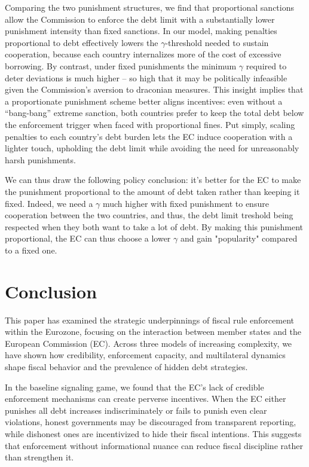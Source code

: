 \documentclass{article}
\begin{document}
Comparing the two punishment structures, we find that proportional sanctions allow the Commission to enforce the debt limit with a substantially lower punishment intensity than fixed sanctions. In our model, making penalties proportional to debt effectively lowers the $\gamma$-threshold needed to sustain cooperation, because each country internalizes more of the cost of excessive borrowing. By contrast, under fixed punishments the minimum $\gamma$ required to deter deviations is much higher – so high that it may be politically infeasible given the Commission’s aversion to draconian measures. This insight implies that a proportionate punishment scheme better aligns incentives: even without a “bang-bang” extreme sanction, both countries prefer to keep the total debt below the enforcement trigger when faced with proportional fines. Put simply, scaling penalties to each country’s debt burden lets the EC induce cooperation with a lighter touch, upholding the debt limit while avoiding the need for unreasonably harsh punishments.

We can thus draw the following policy conclusion: it's better for the EC to make the punishment proportional to the amount of debt taken rather than keeping it fixed. Indeed, we need a $\gamma$ much higher with fixed punishment to ensure cooperation between the two countries, and thus, the debt limit treshold being respected when they both want to take a lot of debt. By making this punishment proportional, the EC can thus choose a lower $\gamma$ and gain "popularity" compared to a fixed one. 




\section{Conclusion}

This paper has examined the strategic underpinnings of fiscal rule enforcement within the Eurozone, focusing on the interaction between member states and the European Commission (EC). Across three models of increasing complexity, we have shown how credibility, enforcement capacity, and multilateral dynamics shape fiscal behavior and the prevalence of hidden debt strategies.

In the baseline signaling game, we found that the EC's lack of credible enforcement mechanisms can create perverse incentives. When the EC either punishes all debt increases indiscriminately or fails to punish even clear violations, honest governments may be discouraged from transparent reporting, while dishonest ones are incentivized to hide their fiscal intentions. This suggests that enforcement without informational nuance can reduce fiscal discipline rather than strengthen it.
\end{document}
